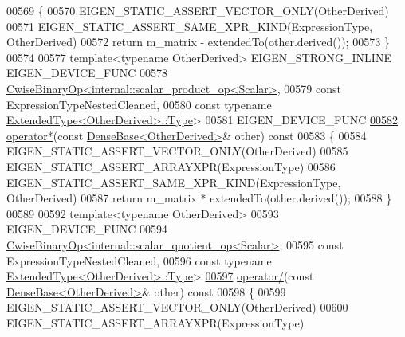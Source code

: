 \begin{DoxyCode}
00569 \textcolor{keyword}{    }\{
00570       EIGEN\_STATIC\_ASSERT\_VECTOR\_ONLY(OtherDerived)
00571       EIGEN\_STATIC\_ASSERT\_SAME\_XPR\_KIND(ExpressionType, OtherDerived)
00572       \textcolor{keywordflow}{return} m\_matrix - extendedTo(other.derived());
00573     \}
00574 
00577     \textcolor{keyword}{template}<\textcolor{keyword}{typename} OtherDerived> EIGEN\_STRONG\_INLINE EIGEN\_DEVICE\_FUNC
00578     \hyperlink{group___core___module_class_eigen_1_1_cwise_binary_op}{CwiseBinaryOp<internal::scalar\_product\_op<Scalar>},
00579                   \textcolor{keyword}{const} ExpressionTypeNestedCleaned,
00580                   \textcolor{keyword}{const} \textcolor{keyword}{typename} \hyperlink{group___core___module_class_eigen_1_1_replicate}{ExtendedType<OtherDerived>::Type}>
00581     EIGEN\_DEVICE\_FUNC
\hyperlink{group___core___module_ab416470ff03705428a5f6f633f815415}{00582}     \hyperlink{group___core___module_ab416470ff03705428a5f6f633f815415}{operator*}(\textcolor{keyword}{const} \hyperlink{group___core___module_class_eigen_1_1_dense_base}{DenseBase<OtherDerived>}& other)\textcolor{keyword}{ const}
00583 \textcolor{keyword}{    }\{
00584       EIGEN\_STATIC\_ASSERT\_VECTOR\_ONLY(OtherDerived)
00585       EIGEN\_STATIC\_ASSERT\_ARRAYXPR(ExpressionType)
00586       EIGEN\_STATIC\_ASSERT\_SAME\_XPR\_KIND(ExpressionType, OtherDerived)
00587       \textcolor{keywordflow}{return} m\_matrix * extendedTo(other.derived());
00588     \}
00589 
00592     \textcolor{keyword}{template}<\textcolor{keyword}{typename} OtherDerived>
00593     EIGEN\_DEVICE\_FUNC
00594     \hyperlink{group___core___module_class_eigen_1_1_cwise_binary_op}{CwiseBinaryOp<internal::scalar\_quotient\_op<Scalar>},
00595                   \textcolor{keyword}{const} ExpressionTypeNestedCleaned,
00596                   \textcolor{keyword}{const} \textcolor{keyword}{typename} \hyperlink{group___core___module_class_eigen_1_1_replicate}{ExtendedType<OtherDerived>::Type}>
\hyperlink{group___core___module_ae36a76f1da78cb2ea74447c86ac68580}{00597}     \hyperlink{group___core___module_ae36a76f1da78cb2ea74447c86ac68580}{operator/}(\textcolor{keyword}{const} \hyperlink{group___core___module_class_eigen_1_1_dense_base}{DenseBase<OtherDerived>}& other)\textcolor{keyword}{ const}
00598 \textcolor{keyword}{    }\{
00599       EIGEN\_STATIC\_ASSERT\_VECTOR\_ONLY(OtherDerived)
00600       EIGEN\_STATIC\_ASSERT\_ARRAYXPR(ExpressionType)

\end{DoxyCode}
